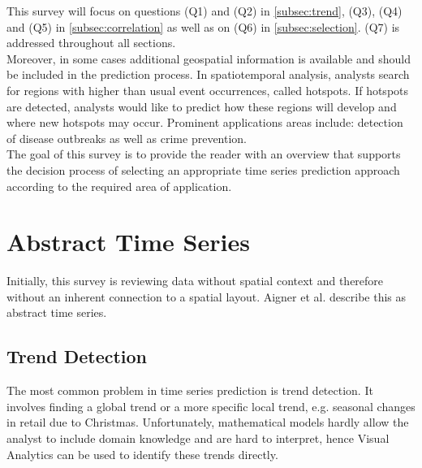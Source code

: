 \documentclass[electronic]{vgtc}             %
\begin{document}
This survey will focus on questions (Q1) and (Q2) in \autoref{subsec:trend}, (Q3), (Q4) and (Q5) in \autoref{subsec:correlation} as well as on (Q6) in \autoref{subsec:selection}.
(Q7) is addressed throughout all sections.\\
Moreover, in some cases additional geospatial information is available and should be included in the prediction process. 
In spatiotemporal analysis, analysts search for regions with higher than usual event occurrences, called hotspots.
If hotspots are detected, analysts would like to predict how these regions will develop and where new hotspots may occur.
Prominent applications areas include: detection of disease outbreaks as well as crime prevention. \\
The goal of this survey is to provide the reader with an overview that supports  the decision process of selecting an appropriate time series prediction approach according to the required area of application.


\section{Abstract Time Series\label{sec:temporal}}
Initially, this survey is reviewing data without spatial context and therefore without an inherent connection to a spatial layout.
Aigner et al. \cite{Aigner:2007} describe this as abstract time series. 

\subsection{Trend Detection\label{subsec:trend}}
The most common problem in time series prediction is trend detection.
It involves finding a global trend or a more specific local trend, e.g. seasonal changes in retail due to Christmas.
Unfortunately, mathematical models hardly allow the analyst to include domain knowledge and are hard to interpret, hence Visual Analytics can be used to identify these trends directly.
\end{document}
